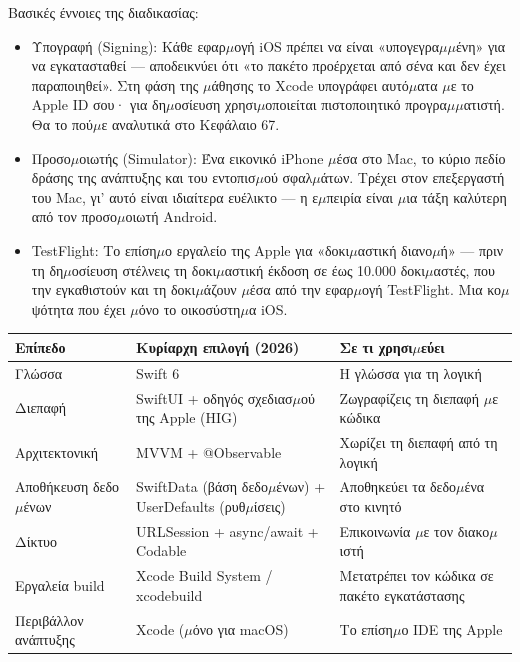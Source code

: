 Βασικές έννοιες της διαδικασίας:

\begin{itemize}
  \item Υπογραφή (Signing): Κάθε εφαρ$\mu$ογή iOS πρέπει να είναι «υπογεγρα$\mu$$\mu$ένη» για να εγκατασταθεί — αποδεικνύει ότι «το πακέτο προέρχεται από σένα και δεν έχει παραποιηθεί». Στη φάση της $\mu$άθησης το Xcode υπογράφει αυτό$\mu$ατα $\mu$ε το Apple ID σου· για δη$\mu$οσίευση χρησι$\mu$οποιείται πιστοποιητικό προγρα$\mu$$\mu$ατιστή. Θα το πού$\mu$ε αναλυτικά στο Κεφάλαιο 67.
  \item Προσο$\mu$οιωτής (Simulator): Ένα εικονικό iPhone $\mu$έσα στο Mac, το κύριο πεδίο δράσης της ανάπτυξης και του εντοπισ$\mu$ού σφαλ$\mu$άτων. Τρέχει στον επεξεργαστή του Mac, γι' αυτό είναι ιδιαίτερα ευέλικτο — η ε$\mu$πειρία είναι $\mu$ια τάξη καλύτερη από τον προσο$\mu$οιωτή Android.
  \item TestFlight: Το επίση$\mu$ο εργαλείο της Apple για «δοκι$\mu$αστική διανο$\mu$ή» — πριν τη δη$\mu$οσίευση στέλνεις τη δοκι$\mu$αστική έκδοση σε έως 10.000 δοκι$\mu$αστές, που την εγκαθιστούν και τη δοκι$\mu$άζουν $\mu$έσα από την εφαρ$\mu$ογή TestFlight. Μια κο$\mu$ψότητα που έχει $\mu$όνο το οικοσύστη$\mu$α iOS.
\end{itemize}


\begin{center}
\begin{tabularx}{\linewidth}{|X|X|X|}
\hline
\textbf{Επίπεδο} & \textbf{Κυρίαρχη επιλογή (2026)} & \textbf{Σε τι χρησι$\mu$εύει} \tabularnewline
\hline
Γλώσσα & Swift 6 & Η γλώσσα για τη λογική \tabularnewline
Διεπαφή & SwiftUI + οδηγός σχεδιασ$\mu$ού της Apple (HIG) & Ζωγραφίζεις τη διεπαφή $\mu$ε κώδικα \tabularnewline
Αρχιτεκτονική & MVVM + @Observable & Χωρίζει τη διεπαφή από τη λογική \tabularnewline
Αποθήκευση δεδο$\mu$ένων & SwiftData (βάση δεδο$\mu$ένων) + UserDefaults (ρυθ$\mu$ίσεις) & Αποθηκεύει τα δεδο$\mu$ένα στο κινητό \tabularnewline
Δίκτυο & URLSession + async/await + Codable & Επικοινωνία $\mu$ε τον διακο$\mu$ιστή \tabularnewline
Εργαλεία build & Xcode Build System / xcodebuild & Μετατρέπει τον κώδικα σε πακέτο εγκατάστασης \tabularnewline
Περιβάλλον ανάπτυξης & Xcode ($\mu$όνο για macOS) & Το επίση$\mu$ο IDE της Apple \tabularnewline
\hline
\end{tabularx}
\end{center}

